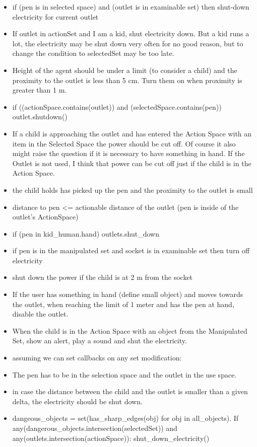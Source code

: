 \begin{itemize}
	\item if (pen is in selected space) and (outlet is in examinable set) then shut-down electricity for current outlet
	\item If outlet in actionSet and I am a kid, shut electricity down. But a kid runs a lot, the electricity may be shut down very often for no good reason, but to change the condition to selectedSet may be too late.
	\item Height of the agent should be under a limit (to consider a child) and the proximity to the outlet is less than 5 cm. Turn them on when proximity is greater than 1 m.
	\item if ((actionSpace.contains(outlet)) and (selectedSpace.contains(pen)) outlet.shutdown()
	\item If a child is approaching the outlet and has entered the Action Space with an item in the Selected Space the power should be cut off. Of course it also might raise the question if it is necessary to have something in hand. If the Outlet is not used, I think that power can be cut off just if the child is in the Action Space.
	\item the child holds has picked up the pen and the proximity to the outlet is small
	\item distance to pen <= actionable distance of the outlet (pen is inside of the outlet's ActionSpace)
	\item if (pen in kid\_human.hand) outlets.shut\_down
	\item if pen is in the manipulated set and socket is in examinable set then turn off electricity
	\item shut down the power if the child is at 2 m from the socket
	\item If the user has something in hand (define small object) and moves towards the outlet, when reaching the limit of 1 meter and has the pen at hand, disable the outlet.
	\item When the child is in the Action Space with an object from the Manipulated Set, show an alert, play a sound and shut the electricity.
	\item assuming we can set callbacks on any set modification:
	\item The pen has to be in the selection space and the outlet in the use space.
	\item in case the distance between the child and the outlet is smaller than a given delta, the electricity should be shut down.
	\item dangeous\_objects = set(has\_sharp\_edges(obj) for obj in all\_objects). If any(dangerous\_objects.intersection(selectedSet)) and any(outlets.intersection(actionSpace)): shut\_down\_electricity()
\end{itemize}

